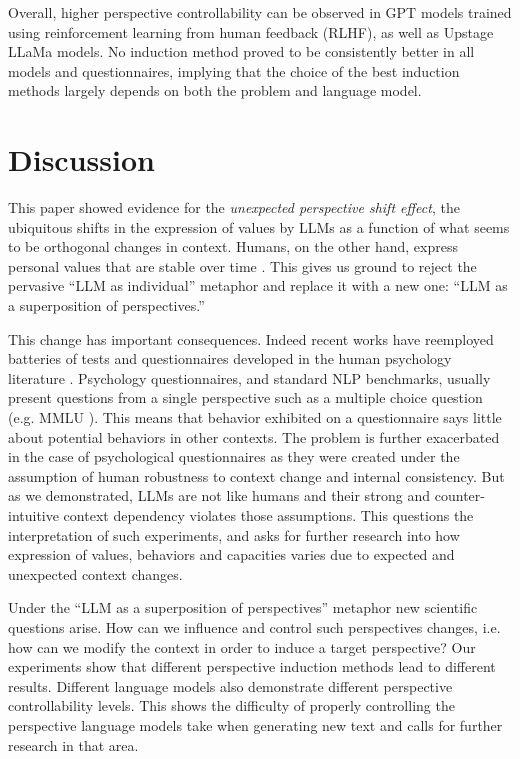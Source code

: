 Overall, higher perspective controllability can be observed in GPT models trained using reinforcement learning from human feedback (RLHF), as well as Upstage LLaMa models. No induction method proved to be consistently better in all models and questionnaires, implying that the choice of the best induction methods largely depends on both the problem and language model. 

\section{Discussion}

This paper showed evidence for the \textit{unexpected perspective shift effect}, the ubiquitous shifts in the expression of values by LLMs as a function of what seems to be orthogonal changes in context. Humans, on the other hand, express personal values that are stable over time \citep{values_stable}. This gives us ground to reject the pervasive ``LLM as individual'' metaphor and replace it with a new one: ``LLM as a superposition of perspectives.''

This change has important consequences. Indeed recent works have reemployed batteries of tests and questionnaires developed in the human psychology literature \citep{Binz2022UsingCP,Miotto2022-jq,holterman2023does}. Psychology questionnaires, and standard NLP benchmarks, usually present questions from a single perspective such as a multiple choice question (e.g. MMLU \citep{mmlu}). This means that behavior exhibited on a questionnaire says little about potential behaviors in other contexts. The problem is further exacerbated in the case of psychological questionnaires as they were created under the assumption of human robustness to context change and internal consistency. But as we demonstrated, LLMs are not like humans and their strong and counter-intuitive context dependency violates those assumptions. This questions the interpretation of such experiments, and asks for further research into how expression of values, behaviors and capacities varies due to expected and unexpected context changes.

Under the ``LLM as a superposition of perspectives'' metaphor new scientific questions arise. How can we influence and control such perspectives changes, i.e. how can we modify the context in order to induce a target perspective? Our experiments show that different perspective induction methods lead to different results. Different language models also demonstrate different perspective controllability levels. This shows the difficulty of properly controlling the perspective language models take when generating new text and calls for further research in that area. 

